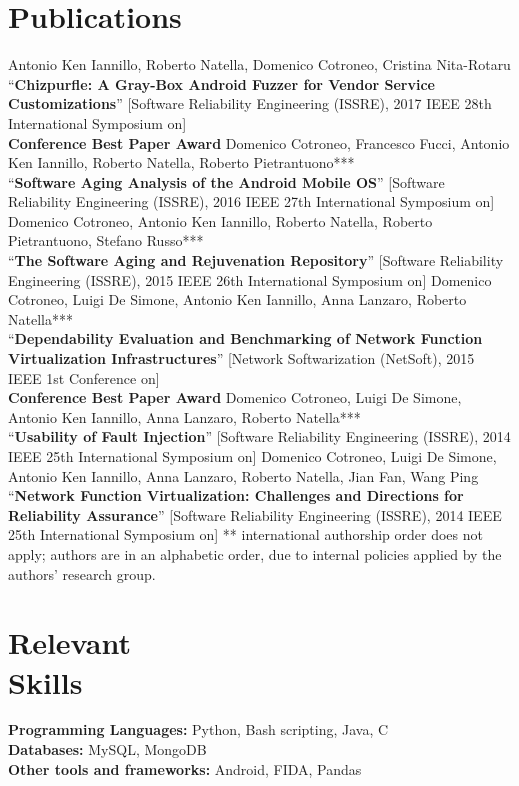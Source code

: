 \documentclass[margin,line]{resume}
\begin{document}
\begin{resume}
\section{\mysidestyle Publications}

\filbreak
Antonio Ken Iannillo, Roberto Natella, Domenico Cotroneo, Cristina Nita-Rotaru\\
``\textbf{Chizpurfle: A Gray-Box Android Fuzzer for Vendor Service Customizations}''
[Software Reliability Engineering (ISSRE), 2017 IEEE 28th International Symposium on]\\\textbf{Conference Best Paper Award}
\filbreak
Domenico Cotroneo, Francesco Fucci, Antonio Ken Iannillo, Roberto Natella, Roberto Pietrantuono***\\
``\textbf{Software Aging Analysis of the Android Mobile OS}''
[Software Reliability Engineering (ISSRE), 2016 IEEE 27th International Symposium on]
\filbreak
Domenico Cotroneo, Antonio Ken Iannillo, Roberto Natella, Roberto Pietrantuono, Stefano Russo***\\
``\textbf{The Software Aging and Rejuvenation Repository}''
[Software Reliability Engineering (ISSRE), 2015 IEEE 26th International Symposium on]
\filbreak
Domenico Cotroneo, Luigi De Simone, Antonio Ken Iannillo, Anna Lanzaro, Roberto Natella***\\
``\textbf{Dependability Evaluation and Benchmarking of Network Function Virtualization Infrastructures}''
[Network Softwarization (NetSoft), 2015 IEEE 1st Conference on]\\\textbf{Conference Best Paper Award}
\filbreak
Domenico Cotroneo, Luigi De Simone, Antonio Ken Iannillo, Anna Lanzaro, Roberto Natella***\\
``\textbf{Usability of Fault Injection}''
[Software Reliability Engineering (ISSRE), 2014 IEEE 25th International Symposium on]
\filbreak
Domenico Cotroneo, Luigi De Simone, Antonio Ken Iannillo, Anna Lanzaro, Roberto Natella, Jian Fan, Wang Ping\\
``\textbf{Network Function Virtualization: Challenges and Directions for Reliability Assurance}''
[Software Reliability Engineering (ISSRE), 2014 IEEE 25th International Symposium on]
\filbreak
{\footnotesize*** international authorship order does not apply; authors are in an alphabetic order, due to internal policies applied by the authors' research group.}

\filbreak
\section{\mysidestyle Relevant\\Skills} 
\textbf{Programming Languages:} Python, Bash scripting, Java, C\vspace{2mm}\\
\textbf{Databases:} MySQL, MongoDB\vspace{2mm}\\
\textbf{Other tools and frameworks:} Android, FIDA, Pandas 



\end{resume}
\end{document}
